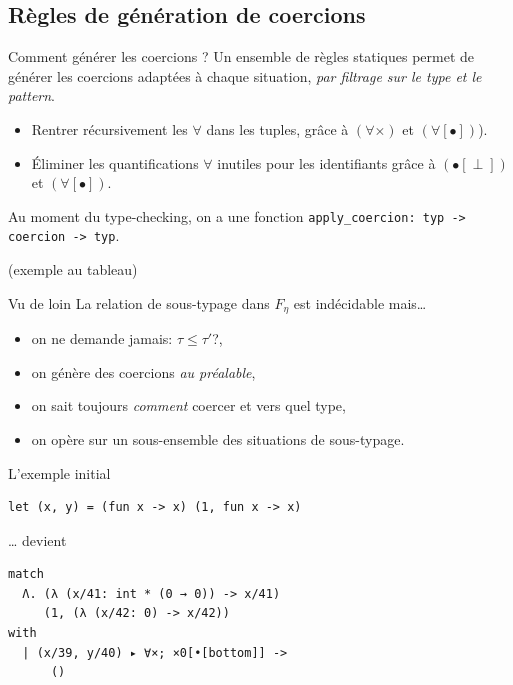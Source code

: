 \documentclass[final]{beamer}
\begin{document}
\subsection{Règles de génération de coercions}

\begin{frame}{Comment générer les coercions ?}
Un ensemble de règles statiques permet de générer les coercions adaptées à
chaque situation, \emph{par filtrage sur le type et le pattern}.

\begin{itemize}
  \item Rentrer récursivement les $\forall$ dans les tuples, grâce à
    $(\forall\times)$ et $(\forall[\bullet])$).
  \item Éliminer les quantifications $\forall$ inutiles pour les identifiants
    grâce à $(\bullet[\perp])$ et $(\forall[\bullet])$.
\end{itemize}

Au moment du type-checking, on a une fonction \texttt{apply\_coercion: typ ->
coercion -> typ}.

\begin{flushright}
  \footnotesize (exemple au tableau)
\end{flushright}

\end{frame}

\begin{frame}{Vu de loin}
  La relation de sous-typage dans $F_\eta$ est indécidable mais…
  \begin{itemize}
    \item on ne demande jamais: $\tau \leq \tau'$?,
    \item on génère des coercions \emph{au préalable},
    \item on sait toujours \emph{comment} coercer et vers quel type,
    \item on opère sur un sous-ensemble des situations de sous-typage.
  \end{itemize}
\end{frame}

\begin{frame}[fragile]{L'exemple initial}

  \begin{verbatim}
let (x, y) = (fun x -> x) (1, fun x -> x)
  \end{verbatim}

  … devient

  \begin{verbatim}
match
  Λ. (λ (x/41: int * (0 → 0)) -> x/41)
     (1, (λ (x/42: 0) -> x/42))
with
  | (x/39, y/40) ▸ ∀×; ×0[•[bottom]] ->
      ()
  \end{verbatim}

\end{frame}
\end{document}
